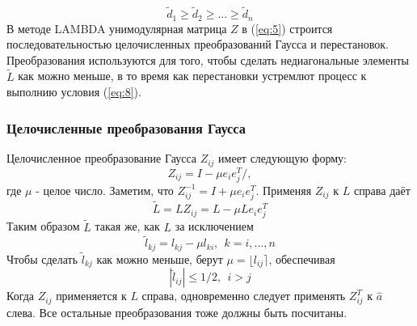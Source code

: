 \documentclass[12pt]{matmex-diploma}
\begin{document}
  \begin{equation}
        \tilde{d}_1 \geq \tilde{d}_2 \geq ... \geq  \tilde{d}_n
        \label{eq:8}
 \end{equation}
В методе LAMBDA унимодулярная матрица $Z$ в (\ref{eq:5}) строится последовательностью
целочисленных преобразований Гаусса и перестановок. Преобразования используются
для того, чтобы сделать недиагональные элементы $\tilde{L}$ как можно меньше,
в то время как перестановки устремлют процесс к выполнию условия (\ref{eq:8}).
\subsubsection{Целочисленные преобразования Гаусса}
Целочисленное преобразование Гаусса $Z_{ij}$ имеет следующую форму:
\begin{equation*}
       Z_{ij} = I - \mu e_i e_j^T / ,
\end{equation*}
где $\mu$ - целое число. Заметим, что $Z^{-1}_{ij} = I + \mu e_i e_j^T$.
Применяя $Z_{ij}$ к $L$ справа даёт
\begin{equation*}
       \tilde{L} = L Z_{ij} = L - \mu L e_i e_j^T
\end{equation*}
Таким образом $\tilde{L}$ такая же, как $L$ за исключением
\begin{equation*}
       \tilde{l}_{kj} = l_{kj} - \mu l_{ki}, \ \ k = i, ... , n
\end{equation*}
Чтобы сделать $\tilde{l}_{kj}$ как можно меньше, берут $\mu = \lfloor l_{ij} \rceil $, обеспечивая
\begin{equation}
       |\tilde{l}_{ij}| \leq 1/2, \ \ i > j
       \label{eq:9.1}
\end{equation}
Когда $Z_{ij}$ применяется к $L$ справа, одновременно следует применять
$Z^T_{ij}$ к $\hat{a}$ слева. Все остальные преобразования тоже должны быть посчитаны.
\end{document}
